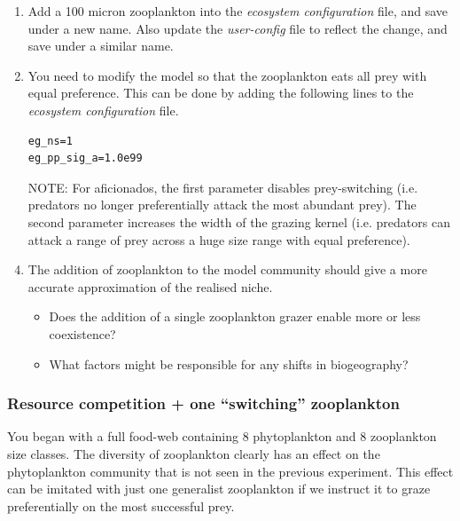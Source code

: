 \documentclass[11pt,fleqn]{book} %
\begin{document}
\vspace{2mm}
\begin{enumerate}[noitemsep]

\item Add a 100 micron zooplankton into the \textit{ecosystem configuration} file, and save under a new name. Also update the \textit{user-config} file to reflect the change, and save under a similar name.

\item You need to modify the model so that the zooplankton eats all prey with equal preference. This can be done by adding the following lines to the \textit{ecosystem configuration} file.
\small\begin{verbatim}
eg_ns=1
eg_pp_sig_a=1.0e99
\end{verbatim}\normalsize

\item[NOTE:] For aficionados, the first parameter disables prey-switching (i.e. predators no longer preferentially attack the most abundant prey). The second parameter increases the width of the grazing kernel (i.e. predators can attack a range of prey across a huge size range with equal preference).

\item The addition of zooplankton to the model community should give a more accurate approximation of the realised niche. 
\begin{itemize}
\item Does the addition of a single zooplankton grazer enable more or less coexistence?
\item What factors might be responsible for any shifts in biogeography?
\end{itemize}

\end{enumerate}
\vspace{2mm}


\subsubsection*{Resource competition + one ``switching'' zooplankton} 

You began with a full food-web containing 8 phytoplankton and 8 zooplankton size classes. The diversity of zooplankton clearly has an effect on the phytoplankton community that is not seen in the previous experiment. This effect can be imitated with just one generalist zooplankton if we instruct it to graze preferentially on the most successful prey. 
\end{document}
